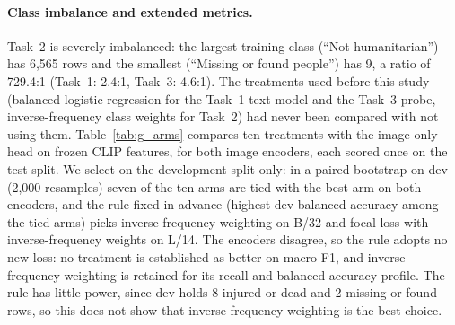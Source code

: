 \paragraph{Class imbalance and extended metrics.}
Task~2 is severely imbalanced: the largest training class (``Not humanitarian'') has 6,565 rows and the smallest (``Missing or found people'') has 9, a ratio of 729.4:1 (Task~1: 2.4:1, Task~3: 4.6:1).
The treatments used before this study (balanced logistic regression for the Task~1 text model and the Task~3 probe, inverse-frequency class weights for Task~2) had never been compared with not using them.
Table~\ref{tab:g_arms} compares ten treatments with the image-only head on frozen CLIP features, for both image encoders, each scored once on the test split.
We select on the development split only: in a paired bootstrap on dev (2,000 resamples) seven of the ten arms are tied with the best arm on both encoders, and the rule fixed in advance (highest dev balanced accuracy among the tied arms) picks inverse-frequency weighting on B/32 and focal loss with inverse-frequency weights on L/14.
The encoders disagree, so the rule adopts no new loss: no treatment is established as better on macro-F1, and inverse-frequency weighting is retained for its recall and balanced-accuracy profile.
The rule has little power, since dev holds 8 injured-or-dead and 2 missing-or-found rows, so this does not show that inverse-frequency weighting is the best choice.
